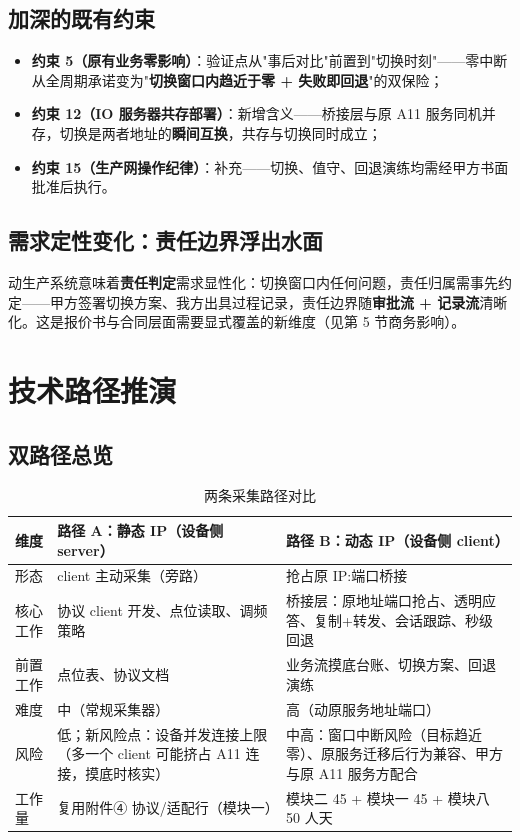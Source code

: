 \documentclass[11pt,a4paper]{ctexart}
\begin{document}
\subsection{加深的既有约束}

\begin{itemize}[leftmargin=*]
  \item \textbf{约束 5（原有业务零影响）}：验证点从"事后对比"前置到"切换时刻"——零中断从全周期承诺变为"\textbf{切换窗口内趋近于零 + 失败即回退}"的双保险；
  \item \textbf{约束 12（IO 服务器共存部署）}：新增含义——桥接层与原 A11 服务同机并存，切换是两者地址的\textbf{瞬间互换}，共存与切换同时成立；
  \item \textbf{约束 15（生产网操作纪律）}：补充——切换、值守、回退演练均需经甲方书面批准后执行。
\end{itemize}

\subsection{需求定性变化：责任边界浮出水面}

动生产系统意味着\textbf{责任判定}需求显性化：切换窗口内任何问题，责任归属需事先约定——甲方签署切换方案、我方出具过程记录，责任边界随\textbf{审批流 + 记录流}清晰化。这是报价书与合同层面需要显式覆盖的新维度（见第 5 节商务影响）。

\section{技术路径推演}

\subsection{双路径总览}

\begin{table}[H]\centering
\caption{两条采集路径对比}
\begin{tabular}{p{2.6cm} p{5.2cm} p{5.0cm}}
\toprule
\textbf{维度} & \textbf{路径 A：静态 IP（设备侧 server）} & \textbf{路径 B：动态 IP（设备侧 client）} \\
\midrule
形态 & client 主动采集（旁路） & 抢占原 IP:端口桥接 \\
核心工作 & 协议 client 开发、点位读取、调频策略 & 桥接层：原地址端口抢占、透明应答、复制+转发、会话跟踪、秒级回退 \\
前置工作 & 点位表、协议文档 & 业务流摸底台账、切换方案、回退演练 \\
难度 & 中（常规采集器） & 高（动原服务地址端口） \\
风险 & 低；新风险点：设备并发连接上限（多一个 client 可能挤占 A11 连接，摸底时核实） & 中高：窗口中断风险（目标趋近零）、原服务迁移后行为兼容、甲方与原 A11 服务方配合 \\
工作量 & 复用附件④ 协议/适配行（模块一） & 模块二 45 + 模块一 45 + 模块八 50 人天 \\
\bottomrule
\end{tabular}
\end{table}
\end{document}
